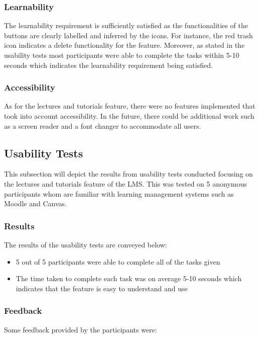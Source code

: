 \subsubsection{Learnability}
The learnability requirement is sufficiently satisfied as the functionalities of the buttons are clearly labelled and inferred by the icons. For instance, the red trash icon indicates a delete functionality for the feature. Moreover, as stated in the usability tests most participants were able to complete the tasks within 5-10 seconds which indicates the learnability requirement being satisfied.

\subsubsection{Accessibility}
As for the lectures and tutorials feature, there were no features implemented that took into account accessibility. In the future, there could be additional work such as a screen reader and a font changer to accommodate all users.

\subsection{Usability Tests}
This subsection will depict the results from usability tests conducted focusing on the lectures and tutorials feature of the LMS. This was tested on 5 anonymous participants whom are familiar with learning management systems such as Moodle and Canvas.

\subsubsection{Results}
The results of the usability tests are conveyed below:

\begin{itemize}
    \item 5 out of 5 participants were able to complete all of the tasks given
    \item The time taken to complete each task was on average 5-10 seconds which indicates that the feature is easy to understand and use
\end{itemize}

\subsubsection{Feedback}
Some feedback provided by the participants were:


